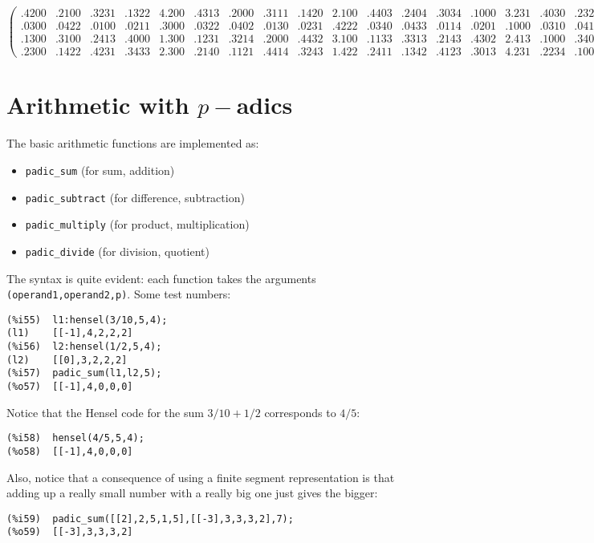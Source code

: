 \documentclass[fleqn]{cas-sc}
\begin{document}
\begin{sideways}
\begin{minipage}{\textheight}
\[\begin{pmatrix}
.4200 & .2100 & .3231 & .1322 & 4.200 & .4313 & .2000 & .3111 & .1420 & 2.100 & .4403 & .2404 & .3034 & .1000 & 3.231 & .4030 & .2323\\
.0300 & .0422 & .0100 & .0211 & .3000 & .0322 & .0402 & .0130 & .0231 & .4222 & .0340 & .0433 & .0114 & .0201 & .1000 & .0310 & .0412\\
.1300 & .3100 & .2413 & .4000 & 1.300 & .1231 & .3214 & .2000 & .4432 & 3.100 & .1133 & .3313 & .2143 & .4302 & 2.413 & .1000 & .3401\\
.2300 & .1422 & .4231 & .3433 & 2.300 & .2140 & .1121 & .4414 & .3243 & 1.422 & .2411 & .1342 & .4123 & .3013 & 4.231 & .2234 & .1000
\end{pmatrix}
\]
\end{minipage}
\end{sideways}


\section{Arithmetic with $p-$adics}\label{sec4}

\noindent The basic arithmetic functions are implemented as:
\begin{itemize}
	\item  \texttt{padic\_sum} (for sum, addition)
	\item  \texttt{padic\_subtract} (for difference, subtraction)
	\item  \texttt{padic\_multiply} (for product, multiplication)
	\item  \texttt{padic\_divide} (for division, quotient)
\end{itemize}

The syntax is quite evident: each function takes the arguments
\texttt{(operand1,operand2,p)}.
Some test numbers:
\begin{verbatim}
(%i55)	l1:hensel(3/10,5,4);
(l1)	[[-1],4,2,2,2]
(%i56)	l2:hensel(1/2,5,4);
(l2)	[[0],3,2,2,2]
(%i57)	padic_sum(l1,l2,5);
(%o57)	[[-1],4,0,0,0]
\end{verbatim}

Notice that the Hensel code for the sum $3/10+1/2$ corresponds to $4/5$:
\begin{verbatim}
(%i58)	hensel(4/5,5,4);
(%o58)	[[-1],4,0,0,0]
\end{verbatim}

Also, notice that a consequence of using a finite segment representation is that
adding up a really small number with a really big one just gives the bigger:
\begin{verbatim}
(%i59)	padic_sum([[2],2,5,1,5],[[-3],3,3,3,2],7);
(%o59)	[[-3],3,3,3,2]
\end{verbatim}
\end{document}
